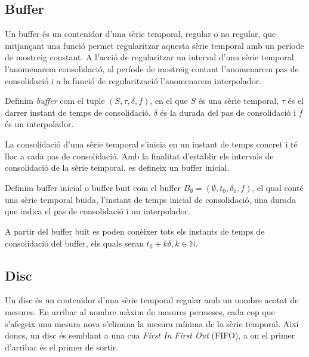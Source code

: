 \subsection{Buffer}\label{sec:model:buffer}

Un buffer és un contenidor d'una sèrie temporal, regular o no regular, que mitjançant una funció permet regularitzar aquesta sèrie temporal amb un període de mostreig constant. A l'acció de regularitzar un interval d'una sèrie temporal l'anomenarem consolidació, al període de mostreig contant l'anomenarem pas de consolidació i a la funció de regularització l'anomenarem interpolador.

\begin{definition}[Buffer]
  Definim \emph{buffer} com el tuple $(S,\tau,\delta,f)$, en el que
  $S$ és una sèrie temporal, $\tau$ és el darrer instant de temps de
  consolidació, $\delta$ és la durada del pas de consolidació i $f$ és
  un interpolador.
\end{definition}

La consolidació d'una sèrie temporal s'inicia en un instant de temps concret i té lloc a cada pas de consolidació. Amb la finalitat d'establir els intervals de consolidació de la sèrie temporal, es defineix un buffer inicial.

\begin{definition}\label{def:model:buffer_buit}
  Definim buffer inicial o buffer buit com el buffer $B_{\emptyset} =
  (\emptyset,t_0, \delta_0, f)$, el qual
  conté una sèrie temporal buida, l'instant de temps inicial de
  consolidació, una durada que indica el pas de consolidació i un
  interpolador.
\end{definition}

A partir del buffer buit es poden conèixer tots els instants de temps de consolidació del buffer, els quals seran $t_0+k\delta, k\in\mathbb{N}$. 



\subsection{Disc}\label{sec:model:disc}

Un disc és un contenidor d'una sèrie temporal regular amb un nombre acotat de mesures. En arribar al nombre màxim de mesures permeses, cada cop que s'afegeix una mesura nova s'elimina la mesura mínima de la sèrie temporal.
Així doncs, un disc és semblant a una cua \emph{First In First Out} (FIFO), a on el primer d'arribar és el primer de sortir.  

